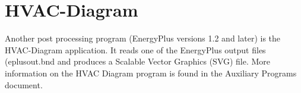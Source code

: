 \section{HVAC-Diagram}\label{hvac-diagram}

Another post processing program (EnergyPlus versions 1.2 and later) is the HVAC-Diagram application. It reads one of the EnergyPlus output files (eplusout.bnd and produces a Scalable Vector Graphics (SVG) file. More information on the HVAC Diagram program is found in the Auxiliary Programs document.
